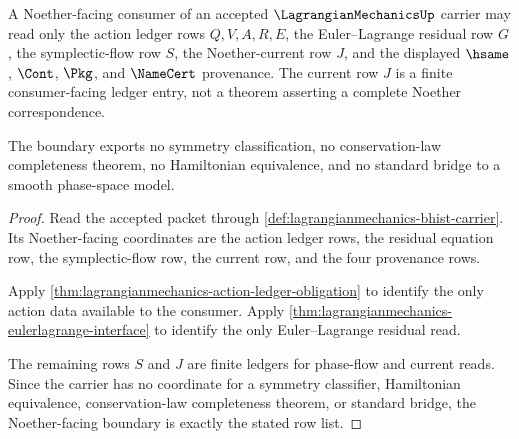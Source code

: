 \begin{theorem}
\label{thm:lagrangianmechanics-noether-consumer-boundary}
A Noether-facing consumer of an accepted $\LagrangianMechanicsUp$ carrier may
read only the action ledger rows $Q,V,A,R,E$, the Euler--Lagrange residual row
$G$, the symplectic-flow row $S$, the Noether-current row $J$, and the
displayed $\hsame$, $\Cont$, $\Pkg$, and $\NameCert$ provenance. The current
row $J$ is a finite consumer-facing ledger entry, not a theorem asserting a
complete Noether correspondence.

The boundary exports no symmetry classification, no conservation-law
completeness theorem, no Hamiltonian equivalence, and no standard bridge to a
smooth phase-space model.
\end{theorem}
\begin{proof}
Read the accepted packet through
\autoref{def:lagrangianmechanics-bhist-carrier}. Its Noether-facing
coordinates are the action ledger rows, the residual equation row, the
symplectic-flow row, the current row, and the four provenance rows.

Apply \autoref{thm:lagrangianmechanics-action-ledger-obligation} to identify
the only action data available to the consumer. Apply
\autoref{thm:lagrangianmechanics-eulerlagrange-interface} to identify the
only Euler--Lagrange residual read.

The remaining rows $S$ and $J$ are finite ledgers for phase-flow and current
reads. Since the carrier has no coordinate for a symmetry classifier,
Hamiltonian equivalence, conservation-law completeness theorem, or standard
bridge, the Noether-facing boundary is exactly the stated row list.
\end{proof}

